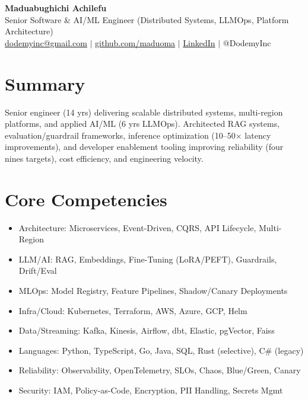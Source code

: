 \documentclass[11pt,a4paper]{article}
\begin{document}
\begin{center}
    \textbf{\Large Maduabughichi Achilefu}\\[4pt]
    Senior Software \& AI/ML Engineer (Distributed Systems, LLMOps, Platform Architecture)\\[2pt]
    \href{mailto:dodemyinc@gmail.com}{dodemyinc@gmail.com} $|$ \href{https://github.com/maduoma}{github.com/maduoma} $|$ \href{https://www.linkedin.com/in/maduabughichiachilefu/}{LinkedIn} $|$ @DodemyInc
\end{center}

\section*{Summary}
Senior engineer (14 yrs) delivering scalable distributed systems, multi-region platforms, and applied AI/ML (6 yrs LLMOps). Architected RAG systems, evaluation/guardrail frameworks, inference optimization (10--50× latency improvements), and developer enablement tooling improving reliability (four nines targets), cost efficiency, and engineering velocity.

\section*{Core Competencies}
\begin{multicols}{2}
\begin{itemize}
  \item Architecture: Microservices, Event-Driven, CQRS, API Lifecycle, Multi-Region
  \item LLM/AI: RAG, Embeddings, Fine-Tuning (LoRA/PEFT), Guardrails, Drift/Eval
  \item MLOps: Model Registry, Feature Pipelines, Shadow/Canary Deployments
  \item Infra/Cloud: Kubernetes, Terraform, AWS, Azure, GCP, Helm
  \item Data/Streaming: Kafka, Kinesis, Airflow, dbt, Elastic, pgVector, Faiss
  \item Languages: Python, TypeScript, Go, Java, SQL, Rust (selective), C# (legacy)
  \item Reliability: Observability, OpenTelemetry, SLOs, Chaos, Blue/Green, Canary
  \item Security: IAM, Policy-as-Code, Encryption, PII Handling, Secrets Mgmt
\end{itemize}
\end{multicols}
\end{document}

